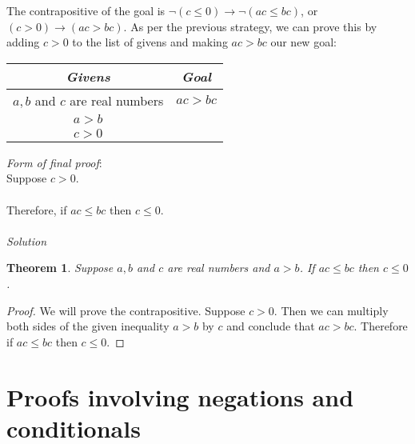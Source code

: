 \documentclass{report}
\newtheorem*{theorem}{Theorem}
\theoremstyle{definition}
\begin{document}
The contrapositive of the goal is $\neg(c\leq0)\to\neg(ac\leq bc)$, or $(c>0)\to(ac>bc)$. As per the previous strategy, we can prove this by adding $c>0$ to the list of givens 
and making $ac>bc$ our new goal:
\begin{center}
\begin{tabular}{c|c}
\textit{Givens}&\textit{Goal}\\
\hline
$a,b$ and $c$ are real numbers&$ac>bc$\\
$a>b$&\\
$c>0$&
\end{tabular}
\end{center}
\textit{Form of final proof}:\\
\indent Suppose $c>0$.\\
\indent{}\\
\indent Therefore, if $ac\leq bc$ then $c\leq0$.\\
\vspace{1mm}\\
\textit{Solution}
\begin{theorem}
Suppose $a,b$ and $c$ are real numbers and $a>b$. If $ac\leq bc$ then $c\leq0$.
\end{theorem}
\begin{proof}
We will prove the contrapositive. Suppose $c>0$. Then we can multiply both sides of the given inequality $a>b$ by $c$ and conclude that $ac>bc$. Therefore if $ac\leq bc$ then $c\leq0$.
\end{proof}
\newpage

\section{Proofs involving negations and conditionals}
\end{document}
